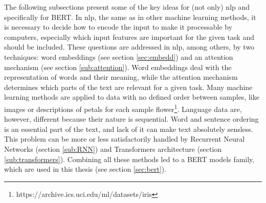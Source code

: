 The following subsections present some of the key ideas for (not only) \acrshort{nlp} and specifically for BERT. In \acrshort{nlp}, the same as in other machine learning methods, it is necessary to decide how to encode the input to make it processable by computers, especially which input features are important for the given task and should be included. These questions are addressed in \acrshort{nlp}, among others, by two techniques: word embeddings (see section \ref{sec:embedd}) and an attention mechanism (see section \ref{sub:attention}). Word embeddings deal with the representation of words and their meaning, while the attention mechanism determines which parts of the text are relevant for a given task. Many machine learning methods are applied to data with no defined order between samples, like images or descriptions of petals for each sample flower\footnote{https://archive.ics.uci.edu/ml/datasets/iris}.
Language data are, however, different because their nature is sequential. Word and sentence ordering is an essential part of the text, and lack of it can make text absolutely sensless. This problem can be more or less satisfactorily handled by Recurrent Neural Networks (section \ref{sub:RNN}) and Transformers architecture (section \ref{sub:transformers}). Combining all these methods led to a BERT models family, which are used in this thesis (see section \ref{sec:bert}).

